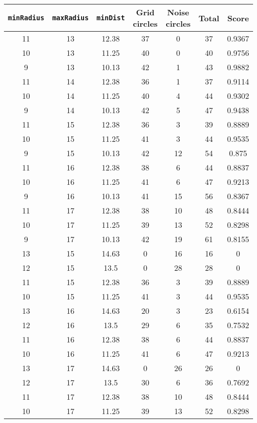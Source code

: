 \documentclass[letterpaper, 12pt]{article}
\begin{document}
\begin{longtable}{|c|c|c|c|c|c|c|}
\hline
\textbf{\texttt{minRadius}} & \textbf{\texttt{maxRadius}} & \textbf{\texttt{minDist}} & \textbf{Grid circles} & \textbf{Noise circles} & \textbf{Total} & \textbf{Score} \\
\hline
11 & 13 & 12.38 & 37 & 0 & 37 & 0.9367 \\
\hline
10 & 13 & 11.25 & 40 & 0 & 40 & 0.9756 \\
\hline
9 & 13 & 10.13 & 42 & 1 & 43 & 0.9882 \\
\hline
11 & 14 & 12.38 & 36 & 1 & 37 & 0.9114 \\
\hline
10 & 14 & 11.25 & 40 & 4 & 44 & 0.9302 \\
\hline
9 & 14 & 10.13 & 42 & 5 & 47 & 0.9438 \\
\hline
11 & 15 & 12.38 & 36 & 3 & 39 & 0.8889 \\
\hline
10 & 15 & 11.25 & 41 & 3 & 44 & 0.9535 \\
\hline
9 & 15 & 10.13 & 42 & 12 & 54 & 0.875 \\
\hline
11 & 16 & 12.38 & 38 & 6 & 44 & 0.8837 \\
\hline
10 & 16 & 11.25 & 41 & 6 & 47 & 0.9213 \\
\hline
9 & 16 & 10.13 & 41 & 15 & 56 & 0.8367 \\
\hline
11 & 17 & 12.38 & 38 & 10 & 48 & 0.8444 \\
\hline
10 & 17 & 11.25 & 39 & 13 & 52 & 0.8298 \\
\hline
9 & 17 & 10.13 & 42 & 19 & 61 & 0.8155 \\
\hline
13 & 15 & 14.63 & 0 & 16 & 16 & 0 \\
\hline
12 & 15 & 13.5 & 0 & 28 & 28 & 0 \\
\hline
11 & 15 & 12.38 & 36 & 3 & 39 & 0.8889 \\
\hline
10 & 15 & 11.25 & 41 & 3 & 44 & 0.9535 \\
\hline
13 & 16 & 14.63 & 20 & 3 & 23 & 0.6154 \\
\hline
12 & 16 & 13.5 & 29 & 6 & 35 & 0.7532 \\
\hline
11 & 16 & 12.38 & 38 & 6 & 44 & 0.8837 \\
\hline
10 & 16 & 11.25 & 41 & 6 & 47 & 0.9213 \\
\hline
13 & 17 & 14.63 & 0 & 26 & 26 & 0 \\
\hline
12 & 17 & 13.5 & 30 & 6 & 36 & 0.7692 \\
\hline
11 & 17 & 12.38 & 38 & 10 & 48 & 0.8444 \\
\hline
10 & 17 & 11.25 & 39 & 13 & 52 & 0.8298 \\

\end{longtable}
\end{document}
